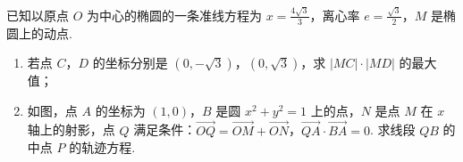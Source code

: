 \begin{problem}
已知以原点 \(O\) 为中心的椭圆的一条准线方程为 \(x = \frac{4\sqrt{3}}{3}\)，离心率 \(e = \frac{\sqrt{3}}{2}\)，\(M\) 是椭圆上的动点.

\begin{enumerate}
\item 若点 \(C\)，\(D\) 的坐标分别是 \((0, -\sqrt{3})\)，\((0, \sqrt{3})\)，求 \(|MC| \cdot |MD|\) 的最大值；
\item 如图，点 \(A\) 的坐标为 \((1,0)\)，\(B\) 是圆 \(x^{2} + y^{2} = 1\) 上的点，\(N\) 是点 \(M\) 在 \(x\) 轴上的射影，点 \(Q\) 满足条件：\(\overrightarrow{OQ} = \overrightarrow{OM} + \overrightarrow{ON}\)，\(\overrightarrow{QA} \cdot \overrightarrow{BA} = 0\). 求线段 \(QB\) 的中点 \(P\) 的轨迹方程.
\end{enumerate}



\end{problem}
